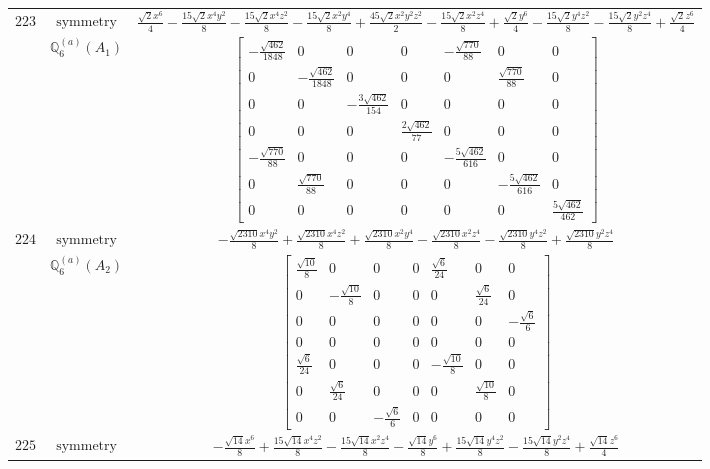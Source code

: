 \documentclass[fleqn,8pt,landscape]{jsarticle}
\begin{document}
\begin{longtable}{ccc}
$ 223 $ & $ \text{symmetry} $ & $ \frac{\sqrt{2} x^{6}}{4} - \frac{15 \sqrt{2} x^{4} y^{2}}{8} - \frac{15 \sqrt{2} x^{4} z^{2}}{8} - \frac{15 \sqrt{2} x^{2} y^{4}}{8} + \frac{45 \sqrt{2} x^{2} y^{2} z^{2}}{2} - \frac{15 \sqrt{2} x^{2} z^{4}}{8} + \frac{\sqrt{2} y^{6}}{4} - \frac{15 \sqrt{2} y^{4} z^{2}}{8} - \frac{15 \sqrt{2} y^{2} z^{4}}{8} + \frac{\sqrt{2} z^{6}}{4} $ \\
$  $ & $ \mathbb{Q}_{6}^{(a)}(A_{1}) $ & $ \begin{bmatrix} - \frac{\sqrt{462}}{1848} & 0 & 0 & 0 & - \frac{\sqrt{770}}{88} & 0 & 0 \\ 0 & - \frac{\sqrt{462}}{1848} & 0 & 0 & 0 & \frac{\sqrt{770}}{88} & 0 \\ 0 & 0 & - \frac{3 \sqrt{462}}{154} & 0 & 0 & 0 & 0 \\ 0 & 0 & 0 & \frac{2 \sqrt{462}}{77} & 0 & 0 & 0 \\ - \frac{\sqrt{770}}{88} & 0 & 0 & 0 & - \frac{5 \sqrt{462}}{616} & 0 & 0 \\ 0 & \frac{\sqrt{770}}{88} & 0 & 0 & 0 & - \frac{5 \sqrt{462}}{616} & 0 \\ 0 & 0 & 0 & 0 & 0 & 0 & \frac{5 \sqrt{462}}{462} \end{bmatrix} $ \\ \hline
$ 224 $ & $ \text{symmetry} $ & $ - \frac{\sqrt{2310} x^{4} y^{2}}{8} + \frac{\sqrt{2310} x^{4} z^{2}}{8} + \frac{\sqrt{2310} x^{2} y^{4}}{8} - \frac{\sqrt{2310} x^{2} z^{4}}{8} - \frac{\sqrt{2310} y^{4} z^{2}}{8} + \frac{\sqrt{2310} y^{2} z^{4}}{8} $ \\
$  $ & $ \mathbb{Q}_{6}^{(a)}(A_{2}) $ & $ \begin{bmatrix} \frac{\sqrt{10}}{8} & 0 & 0 & 0 & \frac{\sqrt{6}}{24} & 0 & 0 \\ 0 & - \frac{\sqrt{10}}{8} & 0 & 0 & 0 & \frac{\sqrt{6}}{24} & 0 \\ 0 & 0 & 0 & 0 & 0 & 0 & - \frac{\sqrt{6}}{6} \\ 0 & 0 & 0 & 0 & 0 & 0 & 0 \\ \frac{\sqrt{6}}{24} & 0 & 0 & 0 & - \frac{\sqrt{10}}{8} & 0 & 0 \\ 0 & \frac{\sqrt{6}}{24} & 0 & 0 & 0 & \frac{\sqrt{10}}{8} & 0 \\ 0 & 0 & - \frac{\sqrt{6}}{6} & 0 & 0 & 0 & 0 \end{bmatrix} $ \\ \hline
$ 225 $ & $ \text{symmetry} $ & $ - \frac{\sqrt{14} x^{6}}{8} + \frac{15 \sqrt{14} x^{4} z^{2}}{8} - \frac{15 \sqrt{14} x^{2} z^{4}}{8} - \frac{\sqrt{14} y^{6}}{8} + \frac{15 \sqrt{14} y^{4} z^{2}}{8} - \frac{15 \sqrt{14} y^{2} z^{4}}{8} + \frac{\sqrt{14} z^{6}}{4} $ \\

\end{longtable}
\end{document}
